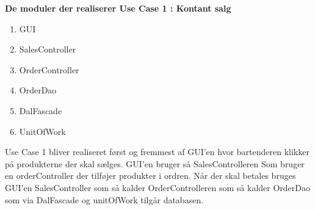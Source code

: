 \textbf{De moduler der realiserer Use Case 1 : Kontant salg}

\begin{enumerate}
	\item GUI
	\item SalesController
	\item OrderController
	\item OrderDao
	\item DalFascade
	\item UnitOfWork
\end{enumerate}

Use Case 1 bliver realiseret først og fremmest af GUI'en hvor bartenderen klikker på produkterne der skal sælges. GUI'en bruger så SalesControlleren Som bruger en orderController der tilføjer produkter i ordren. Når der skal betales bruges GUI'en SalesController som så kalder OrderControlleren som så kalder OrderDao som via DalFascade og unitOfWork tilgår databasen.
